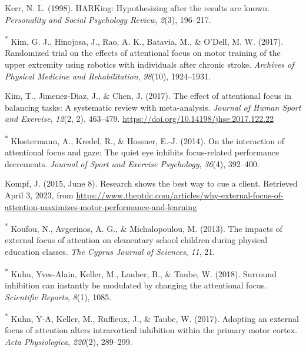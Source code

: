 \documentclass[
  man, donotrepeattitle,floatsintext]{apa7}
\newlength{\cslhangindent}
\newlength{\cslentryspacingunit} %
\newenvironment{CSLReferences}[2] %
 {%
  \setlength{\parindent}{0pt}
  \ifodd #1
  \let\oldpar\par
  \def\par{\hangindent=\cslhangindent\oldpar}
  \fi
  \setlength{\parskip}{#2\cslentryspacingunit}
 }%
 {}
\begin{document}
\begin{CSLReferences}{1}{0}
\leavevmode{}%
Kerr, N. L. (1998). HARKing: Hypothesizing after the results are known. \emph{Personality and Social Psychology Review}, \emph{2}(3), 196--217.

\leavevmode{}%
\textsuperscript{*} Kim, G. J., Hinojosa, J., Rao, A. K., Batavia, M., \& O'Dell, M. W. (2017). Randomized trial on the effects of attentional focus on motor training of the upper extremity using robotics with individuals after chronic stroke. \emph{Archives of Physical Medicine and Rehabilitation}, \emph{98}(10), 1924--1931.

\leavevmode{}%
Kim, T., Jimenez-Diaz, J., \& Chen, J. (2017). The effect of attentional focus in balancing tasks: {A} systematic review with meta-analysis. \emph{Journal of Human Sport and Exercise}, \emph{12}(2, 2), 463--479. \url{https://doi.org/10.14198/jhse.2017.122.22}

\leavevmode{}%
\textsuperscript{*} Klostermann, A., Kredel, R., \& Hossner, E.-J. (2014). On the interaction of attentional focus and gaze: The quiet eye inhibits focus-related performance decrements. \emph{Journal of Sport and Exercise Psychology}, \emph{36}(4), 392--400.

\leavevmode{}%
Kompf, J. (2015, June 8). Research shows the best way to cue a client. Retrieved April 3, 2023, from \url{https://www.theptdc.com/articles/why-external-focus-of-attention-maximizes-motor-performance-and-learning}

\leavevmode{}%
\textsuperscript{*} Koufou, N., Avgerinos, A. G., \& Michalopoulou, M. (2013). The impacts of external focus of attention on elementary school children during physical education classes. \emph{The Cyprus Journal of Sciences}, \emph{11}, 21.

\leavevmode{}%
\textsuperscript{*} Kuhn, Yves-Alain, Keller, M., Lauber, B., \& Taube, W. (2018). Surround inhibition can instantly be modulated by changing the attentional focus. \emph{Scientific Reports}, \emph{8}(1), 1085.

\leavevmode{}%
\textsuperscript{*} Kuhn, Y-A, Keller, M., Ruffieux, J., \& Taube, W. (2017). Adopting an external focus of attention alters intracortical inhibition within the primary motor cortex. \emph{Acta Physiologica}, \emph{220}(2), 289--299.


\end{CSLReferences}
\end{document}
